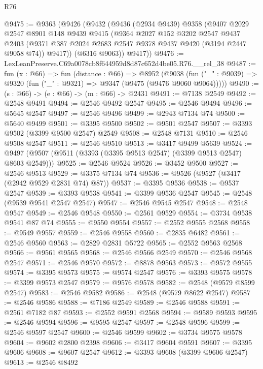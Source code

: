 \begin{lexlean}{R76}
\begin{coremodule}
@9475 := @9363
    (@9426
      (@9432
        (@9436
          (@2934 @9439)
          @9358
          (@9407
            @2029
            @2547
            @8901
            @148
            @9439
            @9415
            (@9364
              @2027
              @152
              @3202
              @2547
              @9437
              @2403
              (@9371 @387 @2024 @2683 @2547 @9378 @9437 @9420 (@3194 @2447 @9058 @74))
              @9417))
          (@6316 @9063))
        @9417))
@9476 := LexLeanPreserve.C69a0078cb8f644959d8d87c652d4be05.R76.__rel_38
@9487 := fun (x : @66) =>
  fun (distance : @66) =>
  @8952
    (@9038 (fun ("_" : @9039) => @9320 (fun ("_" : @9321) => @9347 (@9475 (@9476 @9060 @9064)))))
@9490 := (s : @66) -> (e : @66) -> (m : @66) -> @2431
@9491 := @7138 @2549
@9492 := @2548 @9491
@9494 := @2546 @9492 @2547
@9495 := @2546 @9494
@9496 := @5645 @2547
@9497 := @2546 @9496
@9499 := @2943 @7134 @74
@9500 := @5640 @9499
@9501 := @3395 @9500
@9502 := @9501 @2547
@9507 := @3393 @9502 (@3399 @9500 @2547) @2549
@9508 := @2548 @7131
@9510 := @2546 @9508 @2547
@9511 := @2546 @9510
@9513 := @3417 @9499 @5639
@9524 := @9497 (@9507 (@9511 (@3393 (@3395 @9513 @2547) (@3399 @9513 @2547) @8603 @2549)))
@9525 := @2546 @9524
@9526 := @3452 @9500
@9527 := @2546 @9513
@9529 := @3375 @7134 @74
@9536 := @9526 (@9527 (@3417 (@2942 @9529 @2831 @74) @87))
@9537 := @3395 @9536
@9538 := @9537 @2547
@9539 := @3393 @9538
@9541 := @3399 @9536 @2547
@9545 := @2548 (@9539 @9541 @2547 @2547)
@9547 := @2546 @9545 @2547
@9548 := @2548 @9547
@9549 := @2546 @9548
@9550 := @2561 @9529
@9554 := @3734 @9538 @9541 @87 @74
@9555 := @9550 @9554
@9557 := @2552 @9555 @2568
@9558 := @9549 @9557
@9559 := @2546 @9558
@9560 := @2835 @6482
@9561 := @2546 @9560
@9563 := @2829 @2831 @5722
@9565 := @2552 @9563 @2568
@9566 := @9561 @9565
@9568 := @2546 @9566 @2549
@9570 := @2546 @9568 @2547
@9571 := @2546 @9570
@9572 := @8878 @9563
@9573 := @9572 @9555
@9574 := @3395 @9573
@9575 := @9574 @2547
@9576 := @3393 @9575
@9578 := @3399 @9573 @2547
@9579 := @9576 @9578
@9582 := @2548 (@9579 @8599 @2547)
@9583 := @2546 @9582
@9586 := @2548 (@9579 @8622 @2547)
@9587 := @2546 @9586
@9588 := @7186 @2549
@9589 := @2546 @9588
@9591 := @2561 @7182 @87
@9593 := @2552 @9591 @2568
@9594 := @9589 @9593
@9595 := @2546 @9594
@9596 := @9595 @2547
@9597 := @2548 @9596
@9599 := @2546 @9597 @2547
@9600 := @2546 @9599
@9602 := @3734 @9575 @9578
@9604 := @9602 @2800 @2398
@9606 := @3417 @9604 @9591
@9607 := @3395 @9606
@9608 := @9607 @2547
@9612 := @3393 @9608 (@3399 @9606 @2547)
@9613 := @2546 @8492

\end{coremodule}
\end{lexlean}
